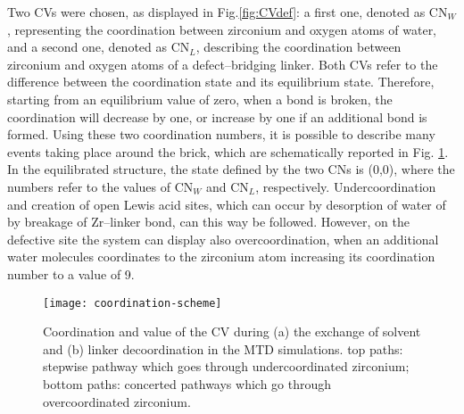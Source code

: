 Two CVs were chosen, as displayed in Fig.\ref{fig:CVdef}: a first one, denoted as CN$_W$, representing the coordination between zirconium and oxygen atoms of water, and a second one, denoted as CN$_L$, describing the coordination between zirconium and oxygen atoms of a defect--bridging linker. Both CVs refer to the difference between the coordination state and its equilibrium state. Therefore, starting from an equilibrium value of zero, when a bond is broken, the coordination will decrease by one, or increase by one if an additional bond is formed. Using these two coordination numbers, it is possible to describe many events taking place around the brick, which are schematically reported in Fig. \ref{fig:coordination-scheme}. In the equilibrated structure, the state defined by the two CNs is (0,0), where the numbers refer to the values of CN$_W$ and CN$_L$, respectively. Undercoordination and creation of open Lewis acid sites, which can occur by desorption of water of by breakage of Zr--linker bond, can this way be followed. However, on the defective site the system can display also overcoordination, when an additional water molecules coordinates to the zirconium atom increasing its coordination number to a value of 9. 
\npar
\begin{figure}[!htbp]
	\centering
	\texttt{[image: coordination-scheme]}
	\caption{ Coordination and value of the CV during (a) the exchange of solvent and (b) linker decoordination in the MTD simulations. top paths: stepwise pathway which goes through undercoordinated zirconium; bottom paths: concerted pathways which go through overcoordinated zirconium.}
	\label{fig:coordination-scheme}
\end{figure}

